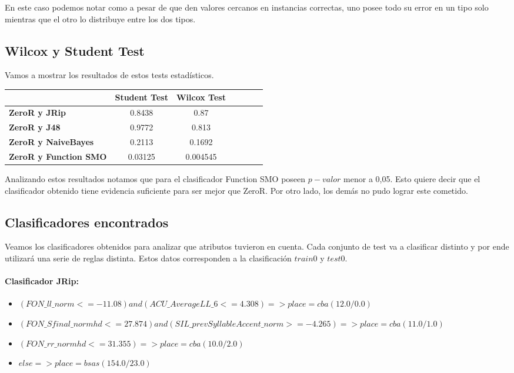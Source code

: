 En este caso podemos notar como a pesar de que den valores cercanos en instancias correctas, uno posee todo su error en un tipo solo mientras que el otro lo distribuye entre los dos tipos.

\subsection{Wilcox y Student Test}

Vamos a mostrar los resultados de estos tests estadísticos.

\begin{table}[H]
\centering
\begin{tabular}{|l|c|c|c|c|c|c|}
\hline
\textbf{}  & \textbf{Student Test} & \textbf{Wilcox Test} \\ \hline
\textbf{ZeroR y JRip}  & 0.8438 & 0.87 \\ \hline
\textbf{ZeroR y J48}  & 0.9772 & 0.813 \\ \hline
\textbf{ZeroR y NaiveBayes}  & 0.2113 & 0.1692 \\ \hline
\textbf{ZeroR y Function SMO}  & 0.03125 & 0.004545 \\ \hline
\end{tabular}
\end{table}

Analizando estos resultados notamos que para el clasificador Function SMO poseen $p-valor$ menor a 0,05. Esto quiere decir que el clasificador obtenido tiene evidencia suficiente para ser mejor que ZeroR. Por otro lado, los demás no pudo lograr este cometido. 

\subsection{Clasificadores encontrados}

Veamos los clasificadores obtenidos para analizar que atributos tuvieron en cuenta. Cada conjunto de test va a clasificar distinto y por ende utilizará una serie de reglas distinta. Estos datos corresponden a la clasificación $train 0$ y $test 0$.

\paragraph*{Clasificador JRip:}

\begin{flushleft}
\begin{itemize}

\item $(FON\_ll\_norm <= -11.08) and (ACU\_AverageLL\_6 <= 4.308) => place=cba (12.0/0.0)$ \\
\item $(FON\_Sfinal\_normhd <= 27.874) and (SIL\_prevSyllableAccent\_norm >= -4.265) => place=cba (11.0/1.0)$ \\
\item $(FON\_rr\_normhd <= 31.355) => place=cba (10.0/2.0)$ \\
\item $ else  => place=bsas (154.0/23.0)$
\end{itemize}
\end{flushleft}

